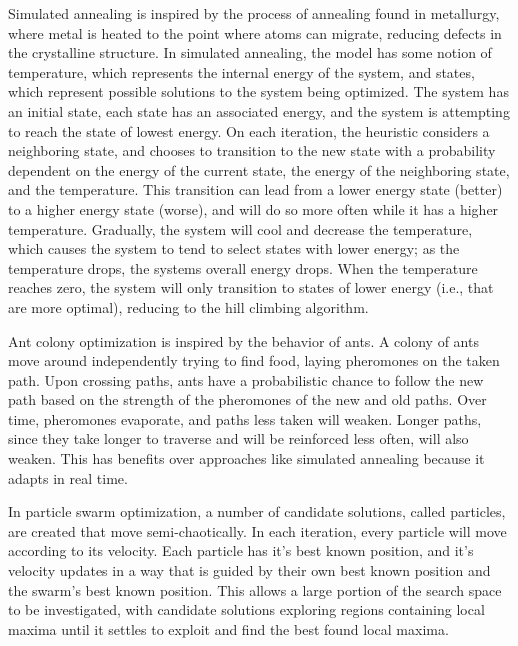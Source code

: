 \documentclass[12pt,dvipsnames]{report}
\begin{document}
Simulated annealing is inspired by the process of annealing found in metallurgy, where metal is heated to the point where atoms can migrate, reducing defects in the crystalline structure.  In simulated annealing, the model has some notion of temperature, which represents the internal energy of the system, and states, which represent possible solutions to the system being optimized.  The system has an initial state, each state has an associated energy, and the system is attempting to reach the state of lowest energy.  On each iteration, the heuristic considers a neighboring state, and chooses to transition to the new state with a probability dependent on the energy of the current state, the energy of the neighboring state, and the temperature.  This transition can lead from a lower energy state (better) to a higher energy state (worse), and will do so more often while it has a higher temperature.  Gradually, the system will cool and decrease the temperature, which causes the system to tend to select states with lower energy; as the temperature drops, the systems overall energy drops.  When the temperature reaches zero, the system will only transition to states of lower energy (i.e., that are more optimal), reducing to the hill climbing algorithm.

Ant colony optimization is inspired by the behavior of ants.  A colony of ants move around independently trying to find food, laying pheromones on the taken path.  Upon crossing paths, ants have a probabilistic chance to follow the new path based on the strength of the pheromones of the new and old paths.  Over time, pheromones evaporate, and paths less taken will weaken.  Longer paths, since they take longer to traverse and will be reinforced less often, will also weaken.  This has benefits over approaches like simulated annealing because it adapts in real time.

In particle swarm optimization, a number of candidate solutions, called particles, are created that move semi-chaotically.  In each iteration, every particle will move according to its velocity.  Each particle has it's best known position, and it's velocity updates in a way that is guided by their own best known position and the swarm's best known position.  This allows a large portion of the search space to be investigated, with candidate solutions exploring regions containing local maxima until it settles to exploit and find the best found local maxima.
\end{document}
